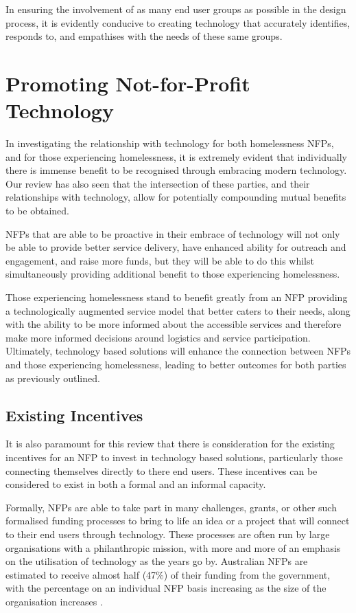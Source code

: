 In ensuring the involvement of as many end user groups as possible in the design process, it is evidently conducive to creating technology that accurately identifies, responds to, and empathises with the needs of these same groups.

\section{Promoting Not-for-Profit Technology}

In investigating the relationship with technology for both homelessness NFPs, and for those experiencing homelessness, it is extremely evident that individually there is immense benefit to be recognised through embracing modern technology. Our review has also seen that the intersection of these parties, and their relationships with technology, allow for potentially compounding mutual benefits to be obtained. 

NFPs that are able to be proactive in their embrace of technology will not only be able to provide better service delivery, have enhanced ability for outreach and engagement, and raise more funds, but they will be able to do this whilst simultaneously providing additional benefit to those experiencing homelessness. 

Those experiencing homelessness stand to benefit greatly from an NFP providing a technologically augmented service model that better caters to their needs, along with the ability to be more informed about the accessible services and therefore make more informed decisions around logistics and service participation. Ultimately, technology based solutions will enhance the connection between NFPs and those experiencing homelessness, leading to better outcomes for both parties as previously outlined.

\subsection{Existing Incentives}

It is also paramount for this review that there is consideration for the existing incentives for an NFP to invest in technology based solutions, particularly those connecting themselves directly to there end users. These incentives can be considered to exist in both a formal and an informal capacity.

Formally, NFPs are able to take part in many challenges, grants, or other such formalised funding processes to bring to life an idea or a project that will connect to their end users through technology. These processes are often run by large organisations with a philanthropic mission, with more and more of an emphasis on the utilisation of technology as the years go by. Australian NFPs are estimated to receive almost half (47\%) of their funding from the government, with the percentage on an individual NFP basis increasing as the size of the organisation increases \cite{acnc2020}.

